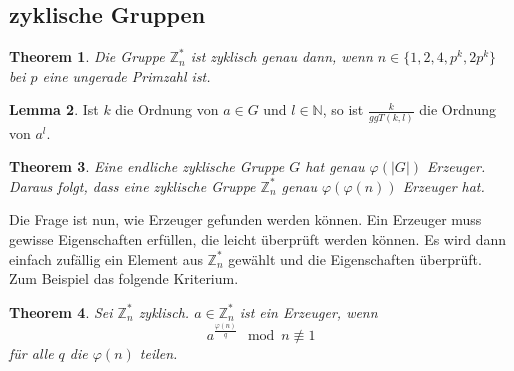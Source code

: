 \documentclass[a4paper, 12pt]{article}
\theoremstyle{plain}
\newtheorem{theorem}{Theorem}[subsection] %
\theoremstyle{definition}
\theoremstyle{lemma}
\newtheorem{lemma}[theorem]{Lemma}
\theoremstyle{remark}
\theoremstyle{corollary}
\theoremstyle{example}
\begin{document}
	\subsection{zyklische Gruppen}
	\begin{theorem}
		Die Gruppe $\mathbb{Z}_n^*$ ist zyklisch genau dann, wenn $n \in \{1,2,4,p^k,2p^k\}$ bei $p$ eine ungerade Primzahl ist.
	\end{theorem}
	\begin{lemma}
		Ist $k$ die Ordnung von $a \in G$ und $l\in \mathbb{N}$, so ist $\frac{k}{ggT(k,l)}$ die Ordnung von $a^l$.
	\end{lemma}
	\begin{theorem}
		Eine endliche zyklische Gruppe $G$ hat genau $\varphi(\left|G\right|)$ Erzeuger. Daraus folgt, dass eine zyklische Gruppe $\mathbb{Z}_n^*$ genau $\varphi(\varphi(n))$ Erzeuger hat.
	\end{theorem}
	Die Frage ist nun, wie Erzeuger gefunden werden können. Ein Erzeuger muss gewisse Eigenschaften erfüllen, die leicht überprüft werden können. Es wird dann einfach zufällig ein Element aus $\mathbb{Z}_n^*$ gewählt und die Eigenschaften überprüft. Zum Beispiel das folgende Kriterium.
	\begin{theorem}
		Sei $\mathbb{Z}_n^*$ zyklisch. $a \in \mathbb{Z}_n^*$ ist ein Erzeuger, wenn \[a^{\frac{\varphi(n)}{q}} \mod n \not\equiv 1\] für alle $q$ die $\varphi(n)$ teilen.
	\end{theorem}
\end{document}
